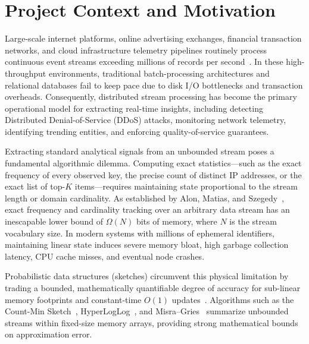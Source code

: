 \section{Project Context and Motivation}

Large-scale internet platforms, online advertising exchanges, financial transaction networks, and cloud infrastructure telemetry pipelines routinely process continuous event streams exceeding millions of records per second~\cite{kafka}. In these high-throughput environments, traditional batch-processing architectures and relational databases fail to keep pace due to disk I/O bottlenecks and transaction overheads. Consequently, distributed stream processing has become the primary operational model for extracting real-time insights, including detecting Distributed Denial-of-Service (DDoS) attacks, monitoring network telemetry, identifying trending entities, and enforcing quality-of-service guarantees.

Extracting standard analytical signals from an unbounded stream poses a fundamental algorithmic dilemma. Computing exact statistics---such as the exact frequency of every observed key, the precise count of distinct IP addresses, or the exact list of top-$K$ items---requires maintaining state proportional to the stream length or domain cardinality. As established by Alon, Matias, and Szegedy~\cite{alon1996space}, exact frequency and cardinality tracking over an arbitrary data stream has an inescapable lower bound of $\Omega(N)$ bits of memory, where $N$ is the stream vocabulary size. In modern systems with millions of ephemeral identifiers, maintaining linear state induces severe memory bloat, high garbage collection latency, CPU cache misses, and eventual node crashes.

Probabilistic data structures (sketches) circumvent this physical limitation by trading a bounded, mathematically quantifiable degree of accuracy for sub-linear memory footprints and constant-time $O(1)$ updates~\cite{muthukrishnan2005data}. Algorithms such as the Count-Min Sketch~\cite{cms}, HyperLogLog~\cite{hll}, and Misra--Gries~\cite{misra} summarize unbounded streams within fixed-size memory arrays, providing strong mathematical bounds on approximation error.

